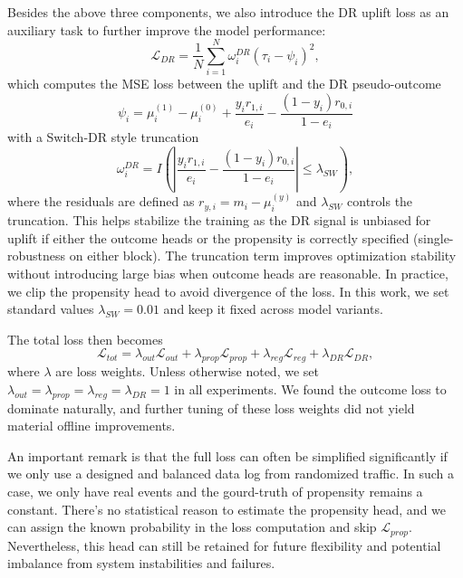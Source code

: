 \documentclass[sigconf, authorversion]{acmart}
\begin{document}
Besides the above three components, we also introduce the DR uplift loss as an auxiliary task to further improve the model performance:
\begin{equation}
    \mathcal{L}_{DR} = \frac{1}{N}\sum_{i=1}^N \omega_i^{DR}\left(\tau_i - \psi_i\right)^2,
\end{equation}
which computes the MSE loss between the uplift and the DR pseudo-outcome
\begin{equation}
    \psi_i = \mu_i^{(1)} - \mu_i^{(0)} + \frac{y_ir_{1,i}}{e_i} - \frac{(1-y_i)r_{0,i}}{1-e_i}
\end{equation}
with a Switch-DR style truncation
\begin{equation}
    \omega_i^{DR} = I\left(\left|\frac{y_ir_{1,i}}{e_i} - \frac{(1-y_i)r_{0,i}}{1-e_i}\right| \leq \lambda_{SW}\right),
\end{equation}
where the residuals are defined as $r_{y,i}=m_i-\mu_i^{(y)}$ and $\lambda_{SW}$ controls the truncation. This helps stabilize the training as the DR signal is unbiased for uplift if either the outcome heads or the propensity is correctly specified (single-robustness on either block). The truncation term improves optimization stability without introducing large bias when outcome heads are reasonable. In practice, we clip the propensity head to avoid divergence of the loss. In this work, we set standard values $\lambda_{SW}=0.01$ and keep it fixed across model variants.

The total loss then becomes
\begin{equation} \label{equ:total_loss}
    \mathcal{L}_{tot} = \lambda_{out} \mathcal{L}_{out} + \lambda_{prop} \mathcal{L}_{prop} + \lambda_{reg} \mathcal{L}_{reg} + \lambda_{DR} \mathcal{L}_{DR},
\end{equation}
where $\lambda$ are loss weights. Unless otherwise noted, we set $\lambda_{out}=\lambda_{prop}=\lambda_{reg}=\lambda_{DR}=1$ in all experiments. We found the outcome loss to dominate naturally, and further tuning of these loss weights did not yield material offline improvements.

An important remark is that the full loss can often be simplified significantly if we only use a designed and balanced data log from randomized traffic. In such a case, we only have real events and the gourd-truth of propensity remains a constant. There’s no statistical reason to estimate the propensity head, and we can assign the known probability in the loss computation and skip $\mathcal{L}_{prop}$. Nevertheless, this head can still be retained for future flexibility and potential imbalance from system instabilities and failures.
\end{document}
